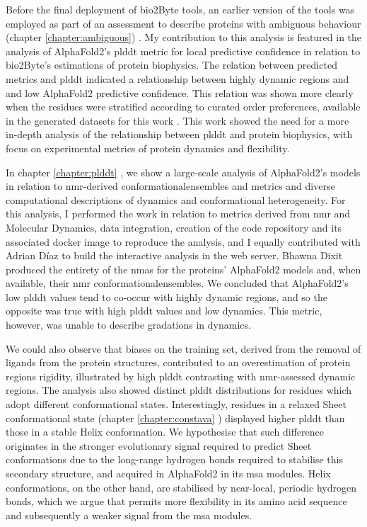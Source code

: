 Before the final deployment of bio2Byte tools, an earlier version of the tools was employed as part of an assessment to describe proteins with ambiguous behaviour (chapter \ref{chapter:ambiguous}) \cite{roca-martinez_challenges_2022}. My contribution to this analysis is featured in the analysis of AlphaFold2's \gls{plddt} metric for local predictive confidence in relation to bio2Byte's estimations of protein biophysics. The relation between predicted metrics and \gls{plddt} indicated a relationship between highly dynamic regions and and low AlphaFold2 predictive confidence. This relation was shown more clearly when the residues were stratified according to curated order preferences, available in the generated datasets for this work \cite{roca-martinez_challenges_2022}. This work showed the need for a more in-depth analysis of the relationship between \gls{plddt} and protein biophysics, with focus on experimental metrics of protein \gls{dynamics} and \gls{flexibility}. 

In chapter \ref{chapter:plddt} \cite{gavalda-garcia_gradations_2024}, we show a large-scale analysis of AlphaFold2's models in relation to \gls{nmr}-derived \glspl{conformationalensemble} and metrics and diverse computational descriptions of \gls{dynamics} and conformational heterogeneity. For this analysis, I performed the work in relation to metrics derived from \gls{nmr} and Molecular Dynamics, data integration, creation of the code repository and its associated docker image to reproduce the analysis, and I equally contributed with Adrian Díaz to build the interactive analysis in the web server. Bhawna Dixit produced the entirety of the \glspl{nma} for the proteins' AlphaFold2 models and, when available, their \gls{nmr} \glspl{conformationalensemble}. We concluded that AlphaFold2's low \gls{plddt} values tend to co-occur with highly dynamic regions, and so the opposite was true with high \gls{plddt} values and low \gls{dynamics}. This metric, however, was unable to describe gradations in \gls{dynamics}. 

We could also observe that biases on the training set, derived from the removal of ligands from the protein structures, contributed to an overestimation of protein regions rigidity, illustrated by high \gls{plddt} contrasting with \gls{nmr}-assessed dynamic regions. The analysis also showed distinct \gls{plddt} distributions for residues which adopt different conformational states. Interestingly, residues in a relaxed Sheet conformational state (chapter \ref{chapter:constava} \cite{gavalda-garcia_data-driven_2024}) displayed higher \gls{plddt} than those in a stable Helix \gls{conformation}. We hypothesise that such difference originates in the stronger evolutionary signal required to predict Sheet \glspl{conformation} due to the long-range hydrogen bonds required to stabilise this secondary structure, and acquired in AlphaFold2 in its \gls{msa} modules. Helix \glspl{conformation}, on the other hand, are stabilised by near-local, periodic hydrogen bonds, which we argue that permits more \gls{flexibility} in its amino acid sequence and subsequently a weaker signal from the \gls{msa} modules. 

